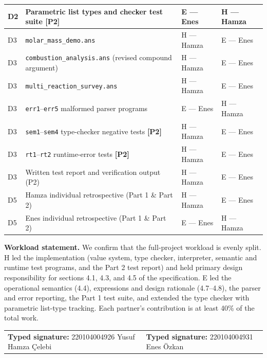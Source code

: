 \documentclass[10pt,a4paper]{article}
\newcommand{\code}[1]{\texttt{#1}}
\newcommand{\ownerEname}{Enes}
\newcommand{\ownerHname}{Hamza}
\begin{document}
\begin{tabularx}{\textwidth}{@{} L{1.25cm} Y L{2.0cm} L{2.0cm} @{}}
D2 & Parametric list types and checker test suite \textbf{[P2]} & E --- \ownerEname & H --- \ownerHname \\
\midrule
D3 & \code{molar\_mass\_demo.ans} & H --- \ownerHname & E --- \ownerEname \\
D3 & \code{combustion\_analysis.ans} (revised compound argument) & H --- \ownerHname & E --- \ownerEname \\
D3 & \code{multi\_reaction\_survey.ans} & H --- \ownerHname & E --- \ownerEname \\
D3 & \code{err1}--\code{err5} malformed parser programs & E --- \ownerEname & H --- \ownerHname \\
D3 & \code{sem1}--\code{sem4} type-checker negative tests \textbf{[P2]} & H --- \ownerHname & E --- \ownerEname \\
D3 & \code{rt1}--\code{rt2} runtime-error tests \textbf{[P2]} & H --- \ownerHname & E --- \ownerEname \\
D3 & Written test report and verification output (P2) & H --- \ownerHname & E --- \ownerEname \\
\midrule
D5 & Hamza individual retrospective (Part 1 \& Part 2) & H --- \ownerHname & E --- \ownerEname \\
D5 & Enes individual retrospective (Part 1 \& Part 2) & E --- \ownerEname & H --- \ownerHname \\
\bottomrule
\end{tabularx}

\normalsize
\vspace{7pt}
\textbf{Workload statement.}
We confirm that the full-project workload is evenly split. H led the implementation (value system, type checker, interpreter, semantic and runtime test programs, and the Part 2 test report) and held primary design responsibility for sections 4.1, 4.3, and 4.5 of the specification. E led the operational semantics (4.4), expressions and design rationale (4.7--4.8), the parser and error reporting, the Part 1 test suite, and extended the type checker with parametric list-type tracking. Each partner's contribution is at least 40\% of the total work.

\vspace{7pt}
\begin{tabularx}{\textwidth}{@{} X X @{}}
\textbf{Typed signature:} 220104004926 Yusuf Hamza Çelebi &
\textbf{Typed signature:} 220104004931 Enes Özkan \\
\end{tabularx}
\end{document}
